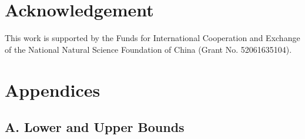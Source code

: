 \documentclass[a4paper,fleqn]{cas-dc}
\begin{document}
\section*{Acknowledgement}

This work is supported by the Funds for International Cooperation and Exchange 
of the National Natural Science Foundation of China (Grant No. 52061635104).




{\color{blue}
\section*{Appendices}

\subsection*{A. Lower and Upper Bounds}

\setcounter{equation}{0}
\renewcommand{\theequation}{A.\arabic{equation}}

}
\end{document}
